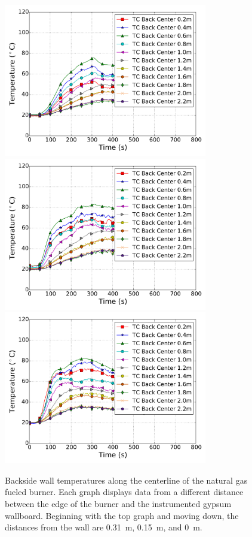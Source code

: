\documentclass[twoside]{uocthesis}
\begin{document}
\begin{figure}[p]
	\centering
	\includegraphics[width=3.5in]{../Figures/IWGBNG01_TC_Back_Center_Avg}\\
	\includegraphics[width=3.5in]{../Figures/IWGBNG04_TC_Back_Center_Avg}\\
	\includegraphics[width=3.5in]{../Figures/IWGBNG05_TC_Back_Center_Avg}\\
	\caption[Backside wall temperatures for the natural gas fueled burner]{Backside wall temperatures along the centerline of the natural gas fueled burner. Each graph displays data from a different distance between the edge of the burner and the instrumented gypsum wallboard.  Beginning with the top graph and moving down, the distances from the wall are 0.31~m, 0.15~m, and 0~m.}
	\label{IWGB_NG_TC_Backside_set}
\end{figure}
\end{document}
